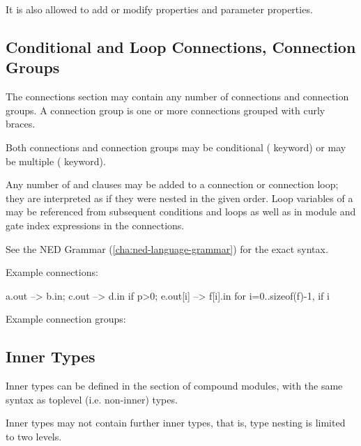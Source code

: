 It is also allowed to add or modify properties and parameter properties.


\subsection{Conditional and Loop Connections, Connection Groups}
\label{sec:ned-ref:connection-groups}

The connections section may contain any number of connections and
connection groups. A connection group is one or more connections
grouped with curly braces.

Both connections and connection groups may be conditional (
keyword) or may be multiple ( keyword).

Any number of  and  clauses may be added to
a connection or connection loop; they are interpreted as if they were
nested in the given order. Loop variables of a  may be
referenced from subsequent conditions and loops as well as in module and
gate index expressions in the connections.

See the NED Grammar (\ref{cha:ned-language-grammar}) for the exact syntax.

Example connections:

\begin{ned}
a.out --> b.in;
c.out --> d.in if p>0;
e.out[i] --> f[i].in for i=0..sizeof(f)-1, if i%
\end{ned}

Example connection groups:




\subsection{Inner Types}
\label{sec:ned-ref:inner-types}

Inner types can be defined in the  section of compound
modules, with the same syntax as toplevel (i.e. non-inner) types.

Inner types may not contain further inner types, that is, type nesting
is limited to two levels.

